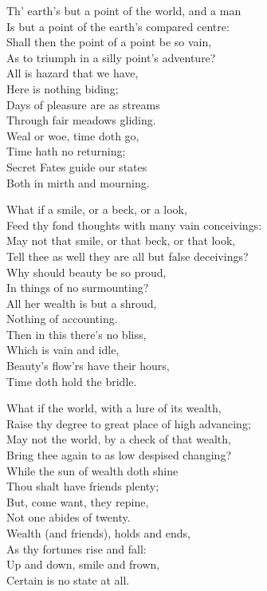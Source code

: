 \settowidth{\versewidth}{Th’ earth’s but a point of the world, and a man}
\begin{dcverse}\begin{patverse}
Th’ earth’s but a point of the world, and a man\\
Is but a point of the earth’s compared centre:\\
Shall then the point of a point be so vain,\\
As to triumph in a silly point’s adventure?\\
All is hazard that we have,\\
Here is nothing biding;\\
Days of pleasure are as streams\\
Through fair meadows gliding.\\
Weal or woe, time doth go,\\
Time hath no returning;\\
Secret Fates guide our states\\
Both in mirth and mourning.
\end{patverse}

\begin{patverse}
What if a smile, or a beck, or a look,\\
Feed thy fond thoughts with many vain conceivings:\\
May not that smile, or that beck, or that look,\\
Tell thee as well they are all but false deceivings?\\
Why should beauty be so proud,\\
In things of no surmounting?\\
All her wealth is but a shroud,\\
Nothing of accounting.\\
Then in this there’s no bliss,\\
Which is vain and idle,\\
Beauty’s flow’rs have their hours,\\
Time doth hold the bridle.
\end{patverse}

\begin{patverse}
What if the world, with a lure of its wealth,\\
Raise thy degree to great place of high advancing;\\
May not the world, by a check of that wealth,\\
Bring thee again to as low despised changing?\\
While the sun of wealth doth shine\\
Thou shalt have friends plenty;\\
But, come want, they repine,\\
Not one abides of twenty.\\
Wealth (and friends), holds and ends,\\
As thy fortunes rise and fall:\\
Up and down, smile and frown,\\
Certain is no state at all.
\end{patverse}


\end{dcverse}
